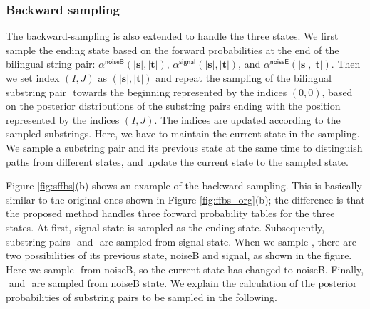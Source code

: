 \documentclass[english]{jnlp_1.4}
\def\subpair#1#2{}
\newcommand{\svec}[1]{}
\begin{document}
\subsubsection{Backward sampling}

The backward-sampling is also extended to handle the three states.
We first sample the ending state based on the forward probabilities at the end of the bilingual string pair:
{$\alpha^\mathsf{noiseB} (|\boldsymbol{s}|, |\boldsymbol{t}|)$},
{$\alpha^\mathsf{signal} (|\boldsymbol{s}|, |\boldsymbol{t}|)$},
and {$\alpha^\mathsf{noiseE} (|\boldsymbol{s}|, |\boldsymbol{t}|)$}.
Then we set index {$(I,J)$} as {$(|\boldsymbol{s}|, |\boldsymbol{t}|)$}
and repeat the sampling of the bilingual substring pair
{$\subpair{\svec{\sigma}_{k}}{\svec{\tau}_{k}}$}
towards the beginning represented by the indices {$(0, 0)$},
based on the posterior distributions of the substring pairs ending with the position represented by the indices {$(I,J)$}.
The indices are updated according to the sampled substrings.
Here, we have to maintain the current state in the sampling.
We sample a substring pair and its previous state at the same time to distinguish paths from different states,
and update the current state to the sampled state.

Figure {\ref{fig:sffbs}}(b) shows an example of the backward sampling.
This is basically similar to the original ones shown in Figure {\ref{fig:ffbs_org}}(b);
the difference is that the proposed method handles three forward probability tables for the three states.
At first, {\sf signal} state is sampled as the ending state.
Subsequently, substring pairs {$\subpair{\text{ー}}{\mathit{ey}}$} and {$\subpair{\text{キ}}{k}$} are sampled from {\sf signal} state.
When we sample {$\subpair{\text{キ}}{k}$}, there are two possibilities of its previous state, {\sf noiseB} and {\sf signal},
as shown in the figure.
Here we sample {$\subpair{\text{キ}}{k}$} from {\sf noiseB}, so the current state has changed to {\sf noiseB}.
Finally, {$\subpair{noise}{\mathsf{sp}}$} and {$\subpair{noise}{a}$} are sampled from {\sf noiseB} state.
We explain the calculation of the posterior probabilities of substring pairs to be sampled in the following.
\end{document}
